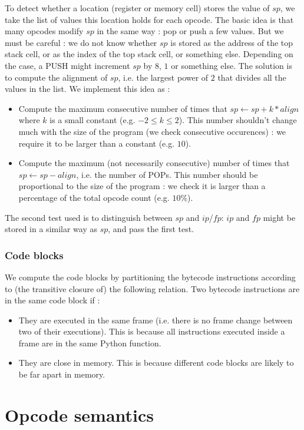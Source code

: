 \documentclass[french]{article}
\begin{document}
To detect whether a location (register or memory cell) stores the value of $sp$, we take the list of values this location holds for each opcode. The basic idea is that many opcodes modify $sp$ in the same way : pop or push a few values. But we must be careful : we do not know whether $sp$ is stored as the address of the top stack cell, or as the index of the top stack cell, or something else. Depending on the case, a PUSH might increment $sp$ by $8$, $1$ or something else. The solution is to compute the alignment of $sp$, i.e. the largest power of $2$ that divides all the values in the list. We implement this idea as :
\begin{itemize}
	\item Compute the maximum consecutive number of times that $sp \leftarrow sp + k*align$ where $k$ is a small constant (e.g. $-2 \leq k \leq 2$). This number shouldn't change much with the size of the program (we check consecutive occurences) : we require it to be larger than a constant (e.g. $10$).
	\item Compute the maximum (not necessarily consecutive) number of times that $sp \leftarrow sp - align$, i.e. the number of POPs. This number should be proportional to the size of the program : we check it is larger than a percentage of the total opcode count (e.g. $10\%$).
\end{itemize}
The second test used is to distinguish between $sp$ and $ip$/$fp$: $ip$ and $fp$ might be stored in a similar way as $sp$, and pass the first test. 

\subsubsection{Code blocks}

We compute the code blocks by partitioning the bytecode instructions according to (the transitive closure of) the following relation. Two bytecode instructions are in the same code block if :
\begin{itemize}
	\item They are executed in the same frame (i.e. there is no frame change between two of their executions). This is because all instructions executed inside a frame are in the same Python function.
	\item They are close in memory. This is because different code blocks are likely to be far apart in memory. %
\end{itemize}


\section{Opcode semantics}
\end{document}
